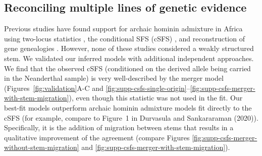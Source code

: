 \documentclass[]{article}
\begin{document}
\subsection*{Reconciling multiple lines of genetic evidence}

Previous studies have found support for archaic hominin admixture in Africa
using two-locus statistics \citep{Hsieh2016-gk,Ragsdale2019-nt}, the
conditional SFS (cSFS) \citep{Durvasula2020-td}, and reconstruction of gene
genealogies \citep{Speidel2019-nj}. However, none of these studies considered a
weakly structured stem. We validated our inferred models with additional
independent approaches. We find that the observed cSFS (conditioned on the
derived allele being carried in the Neanderthal sample) is very well-described
by the merger model (Figures~\ref{fig:validation}A-C and
\ref{fig:supp-csfs-single-origin}--\ref{fig:supp-csfs-merger-with-stem-migration}),
even though this statistic was not used in the fit. Our best-fit models
outperform archaic hominin admixture models fit directly to the cSFS (for
example, compare to Figure~1 in Durvasula and Sankararaman
(2020)\citep{Durvasula2020-td}).  Specifically, it is the addition of migration
between stems that results in a qualitative improvement of the agreement
(compare Figures \ref{fig:supp-csfs-merger-without-stem-migration}  and
\ref{fig:supp-csfs-merger-with-stem-migration}).
\end{document}
